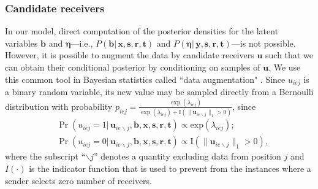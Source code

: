 \documentclass[ba]{imsart}
\numberwithin{equation}{section}
\theoremstyle{plain}
\begin{document}
	\subsubsection{Candidate receivers}
	In our model, direct computation of the posterior densities for the latent variables $\boldsymbol{b}$ and $\boldsymbol{\eta}$---i.e., $P(\boldsymbol{b}|\,\boldsymbol{x},\boldsymbol{s}, \boldsymbol{r},\boldsymbol{t})$ and $P(\boldsymbol{\eta}|\,\boldsymbol{y},\boldsymbol{s}, \boldsymbol{r},\boldsymbol{t})$---is not possible. However, it is possible to augment the data by candidate receivers $\boldsymbol{u}$ such that we can obtain their conditional posterior by conditioning on samples of $\boldsymbol{u}$. %
	We use this common tool in Bayesian statistics called ``data augmentation" \citep{tanner1987calculation,neal2015exact}. Since $u_{iej}$ is a binary random variable, its new value may be sampled directly from a Bernoulli distribution with probability $p_{iej} =\frac{\exp(\lambda_{iej})}{\exp(\lambda_{iej})+\text{I}(\lVert\boldsymbol{u}_{ie\backslash j}\rVert_1 > 0 )}$, since
	\begin{equation}
		\begin{aligned}
			&\Pr(u_{iej}=1| \,\boldsymbol{u}_{ie\backslash j}, \boldsymbol{b}, \boldsymbol{x},\boldsymbol{s}, \boldsymbol{r},\boldsymbol{t})
			\propto \mbox{exp}(\lambda_{iej});\\
			&\Pr(u_{iej}=0|\, \boldsymbol{u}_{ie\backslash j},\boldsymbol{b}, \boldsymbol{x},\boldsymbol{s}, \boldsymbol{r},\boldsymbol{t})\propto \text{I}(\lVert\boldsymbol{u}_{ie\backslash j}\rVert_1 > 0 ),
		\end{aligned}
		\label{eqn:latentreceiver}
	\end{equation}
	where the subscript ``$\backslash j$'' denotes a quantity excluding data from position $j$ and $I(\cdot)$ is the indicator function that is used to prevent from the instances where a sender selects zero number of receivers. 
\end{document}
